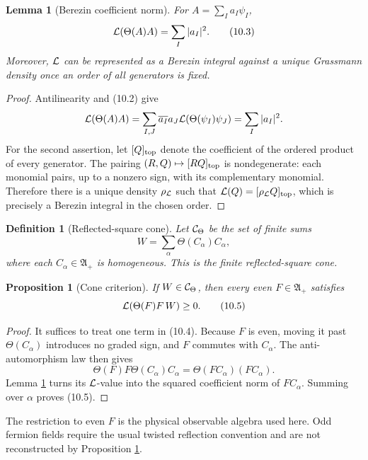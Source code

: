 \documentclass[11pt]{article}
\newtheorem{proposition}[theorem]{Proposition}
\newtheorem{lemma}[theorem]{Lemma}
\newtheorem{definition}[theorem]{Definition}
\theoremstyle{remark}
\begin{document}
\begin{lemma}[Berezin coefficient norm]
\label{lem:v19v7-coefficient}
For \(A=\sum_I a_I\psi_I\),
\[
 {\cal L}\!\left(\Theta(A)A\right)=\sum_I|a_I|^2.              \tag{10.3}
\]
Moreover, \({\cal L}\) can be represented as a Berezin integral against a
unique Grassmann density once an order of all generators is fixed.
\end{lemma}

\begin{proof}
Antilinearity and (10.2) give
\[
 {\cal L}\!\left(\Theta(A)A\right)
 =\sum_{I,J}\overline{a_I}a_J
   {\cal L}\!\left(\Theta(\psi_I)\psi_J\right)
 =\sum_I|a_I|^2.
\]
For the second assertion, let \([Q]_{\rm top}\) denote the coefficient of
the ordered product of every generator.  The pairing
\((R,Q)\mapsto[RQ]_{\rm top}\) is nondegenerate: each monomial pairs,
up to a nonzero sign, with its complementary monomial.  Therefore there is
a unique density \(\rho_{\cal L}\) such that
\({\cal L}(Q)=[\rho_{\cal L}Q]_{\rm top}\), which is precisely a Berezin
integral in the chosen order.
\end{proof}

\begin{definition}[Reflected-square cone]
\label{def:v19v7-cone}
Let \({\cal C}_\Theta\) be the set of finite sums
\[
 W=\sum_{\alpha}\Theta(C_\alpha)C_\alpha,                     \tag{10.4}
\]
where each \(C_\alpha\in{\mathfrak A}_+\) is homogeneous.  This is the
finite reflected-square cone.
\end{definition}

\begin{proposition}[Cone criterion]
\label{prop:v19v7-cone}
If \(W\in{\cal C}_\Theta\), then every even
\(F\in{\mathfrak A}_+\) satisfies
\[
 {\cal L}\!\left(\Theta(F)F\,W\right)\geq0.                    \tag{10.5}
\]
\end{proposition}

\begin{proof}
It suffices to treat one term in (10.4).  Because \(F\) is even, moving it
past \(\Theta(C_\alpha)\) introduces no graded sign, and \(F\) commutes
with \(C_\alpha\).  The anti-automorphism law then gives
\[
 \Theta(F)F\Theta(C_\alpha)C_\alpha
 =\Theta(FC_\alpha)(FC_\alpha).
\]
Lemma \ref{lem:v19v7-coefficient} turns its \({\cal L}\)-value into the
squared coefficient norm of \(FC_\alpha\).  Summing over \(\alpha\) proves
(10.5).
\end{proof}

The restriction to even \(F\) is the physical observable algebra used
here.  Odd fermion fields require the usual twisted reflection convention
and are not reconstructed by Proposition \ref{prop:v19v7-cone}.
\end{document}
